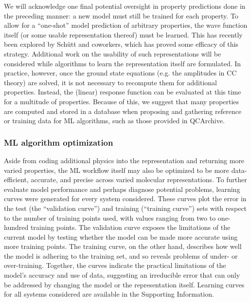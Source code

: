 We will acknowledge one final potential oversight in property predictions done in the preceding manner:
a new model must still be trained for each property. 
To allow for a ``one-shot'' model prediction of arbitrary properties, the wave function itself (or some usable representation thereof) must be learned. 
This has recently been explored by Sch\"{u}tt and coworkers\cite{Schutt2019}, 
which has proved some efficacy of this strategy. 
Additional work on the usability of such representations will be considered while algorithms to learn the representation itself are formulated.
In practice, however, once the ground state equations (e.g. the amplitudes in CC theory) are solved, it is not necessary to recompute them for additional properties. Instead, the (linear) response function can be evaluated at this time for a multitude of properties.
Because of this, we suggest that many properties are computed and stored in a database when proposing and gathering reference or training data for ML algorithms, such as those provided in QCArchive\cite{Smith2020a}.

\subsubsection{ML algorithm optimization} \label{alg_opt}
Aside from coding additional physics into the representation and returning more varied properties, the ML workflow itself may also be optimized to be more data-efficient, accurate, and precise across varied molecular representations. To further evaluate model performance and perhaps diagnose potential problems, learning curves were generated for every system considered. These curves plot the error in the test (the ``validation curve'') and training (``training curve'') sets with respect to the number of training points used, with values ranging from two to one-hundred training points. The validation curve exposes the limitations of the current model by testing whether the model can be made more accurate using more training points. The training curve, on the other hand, describes how well the model is adhering to the training set, and so reveals problems of under- or over-training. Together, the curves indicate the practical limitations of the model's accuracy and use of data, suggesting an irreducible error that can only be addressed by changing the model or the representation itself. Learning curves for all systems considered are available in the Supporting Information.

